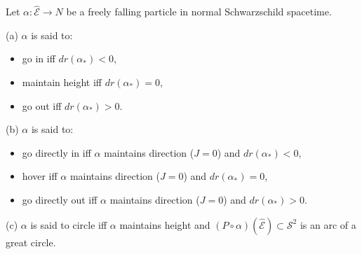 Let $\alpha: \hat{\mathcal{E}} \rightarrow N$ be a freely falling particle in normal Schwarzschild spacetime.

(a) $\alpha$ is said to:
\begin{itemize}
  \item go in iff $dr(\alpha_*) < 0$,
  \item maintain height iff $dr(\alpha_*) = 0$,
  \item go out iff $dr(\alpha_*) > 0$.
\end{itemize}

(b) $\alpha$ is said to:
\begin{itemize}
  \item go directly in iff $\alpha$ maintains direction ($J = 0$) and $dr(\alpha_*) < 0$,
  \item hover iff $\alpha$ maintains direction ($J = 0$) and $dr(\alpha_*) = 0$,
  \item go directly out iff $\alpha$ maintains direction ($J = 0$) and $dr(\alpha_*) > 0$.
\end{itemize}

(c) $\alpha$ is said to circle iff $\alpha$ maintains height and $(P \circ \alpha)(\hat{\mathcal{E}}) \subset \mathcal{S}^2$ is an arc of a great circle.